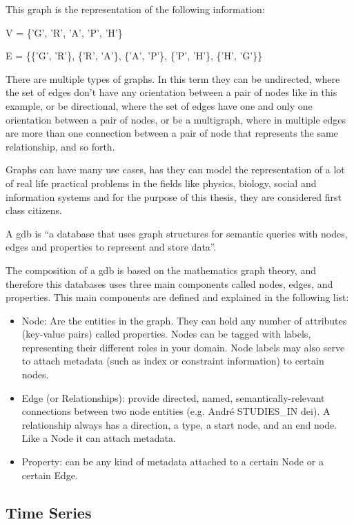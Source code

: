 This graph is the representation of the following information:

V = \{'G', 'R', 'A', 'P', 'H'\}

E = \{\{'G', 'R'\}, \{'R', 'A'\}, \{'A', 'P'\}, \{'P', 'H'\}, \{'H', 'G'\}\}

There are multiple types of graphs. In this term they can be undirected, where the set of edges don't have any orientation between a pair of nodes like in this example, or be directional, where the set of edges have one and only one orientation between a pair of nodes, or be a multigraph, where in multiple edges are more than one connection between a pair of node that represents the same relationship, and so forth.

Graphs can have many use cases, has they can model the representation of a lot of real life practical problems in the fields like physics, biology, social and information systems and for the purpose of this thesis, they are considered first class citizens.

A \gls{gdb} is ``a database that uses graph structures for semantic queries with nodes, edges and properties to represent and store data''\cite{graph_database_definition}.

The composition of a \gls{gdb} is based on the mathematics graph theory, and therefore this databases uses three main components called nodes, edges, and properties. This main components are defined and explained in the following list:

\begin{itemize}
    \item Node: Are the entities in the graph. They can hold any number of attributes (key-value pairs) called properties. Nodes can be tagged with labels, representing their different roles in your domain. Node labels may also serve to attach metadata (such as index or constraint information) to certain nodes.
    \item Edge (or Relationships): provide directed, named, semantically-relevant connections between two node entities (e.g. André STUDIES\_IN \gls{dei}). A relationship always has a direction, a type, a start node, and an end node. Like a Node it can attach metadata. 
    \item Property: can be any kind of metadata attached to a certain Node or a certain Edge.
\end{itemize}

\subsection{Time Series}
\label{subsec:time_series}

